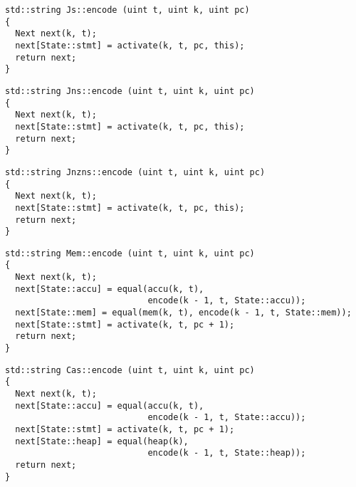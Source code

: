 
\begin{lstlisting}[style=c++, style=encode]
std::string Js::encode (uint t, uint k, uint pc)
{
  Next next(k, t);
  next[State::stmt] = activate(k, t, pc, this);
  return next;
}
\end{lstlisting}


\begin{lstlisting}[style=c++, style=encode]
std::string Jns::encode (uint t, uint k, uint pc)
{
  Next next(k, t);
  next[State::stmt] = activate(k, t, pc, this);
  return next;
}
\end{lstlisting}


\begin{lstlisting}[style=c++, style=encode]
std::string Jnzns::encode (uint t, uint k, uint pc)
{
  Next next(k, t);
  next[State::stmt] = activate(k, t, pc, this);
  return next;
}
\end{lstlisting}


\newpage

\begin{lstlisting}[style=c++, style=encode]
std::string Mem::encode (uint t, uint k, uint pc)
{
  Next next(k, t);
  next[State::accu] = equal(accu(k, t),
                            encode(k - 1, t, State::accu));
  next[State::mem] = equal(mem(k, t), encode(k - 1, t, State::mem));
  next[State::stmt] = activate(k, t, pc + 1);
  return next;
}
\end{lstlisting}


\begin{lstlisting}[style=c++, style=encode]
std::string Cas::encode (uint t, uint k, uint pc)
{
  Next next(k, t);
  next[State::accu] = equal(accu(k, t),
                            encode(k - 1, t, State::accu));
  next[State::stmt] = activate(k, t, pc + 1);
  next[State::heap] = equal(heap(k),
                            encode(k - 1, t, State::heap));
  return next;
}
\end{lstlisting}

